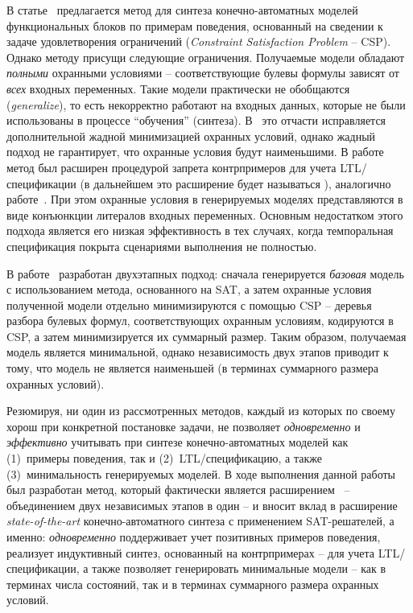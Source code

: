 В статье~\cite{fbCSP} предлагается метод  для синтеза конечно-автоматных моделей функциональных блоков по примерам поведения, основанный на сведении к задаче удовлетворения ограничений (\textit{Constraint Satisfaction Problem} \--- CSP).
Однако методу  присущи следующие ограничения.
Получаемые модели обладают \textit{полными} охранными условиями \--- соответствующие булевы формулы зависят от \textit{всех} входных переменных.
Такие модели практически не обобщаются (\textit{generalize}), то есть некорректно работают на входных данных, которые не были использованы в процессе \enquote{обучения} (синтеза).
В~\cite{fbCSP} это отчасти исправляется дополнительной жадной минимизацией охранных условий, однако жадный подход не гарантирует, что охранные условия будут наименьшими.
В работе~\cite{chivilikhin-18} метод  был расширен процедурой запрета контрпримеров для учета LTL\-/спецификации (в дальнейшем это расширение будет называться ), аналогично работе~\cite{efsm-tools}.
При этом охранные условия в генерируемых моделях представляются в виде конъюнкции литералов входных переменных.
Основным недостатком этого подхода является его низкая эффективность в тех случаях, когда темпоральная спецификация покрыта сценариями выполнения не полностью.

В работе~\cite{chivilikhin-19} разработан двухэтапных подход:
сначала генерируется \textit{базовая} модель с использованием метода, основанного на SAT, а затем охранные условия полученной модели отдельно минимизируются с помощью CSP \--- деревья разбора булевых формул, соответствующих охранным условиям, кодируются в CSP, а затем минимизируется их суммарный размер.
Таким образом, получаемая модель является минимальной, однако независимость двух этапов приводит к тому, что модель не является наименьшей (в терминах суммарного размера охранных условий).

Резюмируя, ни один из рассмотренных методов, каждый из которых по своему хорош при конкретной постановке задачи, не позволяет \textit{одновременно} и \textit{эффективно} учитывать при синтезе конечно-автоматных моделей как (1)~примеры поведения, так и (2)~LTL\-/спецификацию, а также (3)~минимальность генерируемых моделей.
В ходе выполнения данной работы был разработан метод, который фактически является расширением~\cite{chivilikhin-19} \--- объединением двух независимых этапов в один \--- и вносит вклад в расширение \textit{state-of-the-art} конечно-автоматного синтеза с применением SAT-решателей, а именно: \textit{одновременно} поддерживает учет позитивных примеров поведения, реализует индуктивный синтез, основанный на контрпримерах \--- для учета LTL\-/спецификации, а также позволяет генерировать минимальные модели \--- как в терминах числа состояний, так и в терминах суммарного размера охранных условий.

